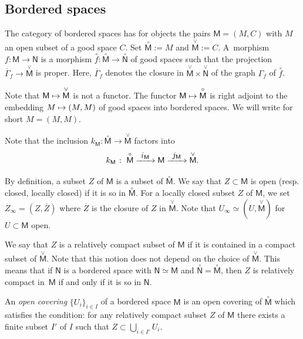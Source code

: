 \documentclass[11pt]{article}
\newcommand{\resp}{resp.\xspace}
\numberwithin{equation}{section}
\newcommand\mto{\mathchoice{\longmapsto}{\mapsto}{\mapsto}{\mapsto}}
\newcommand{\To}[1][]{\mathchoice{\xrightarrow{\textstyle\kern4pt#1\kern3pt}}{\stackrel{#1}{\longrightarrow}}{}{}}
\let\sbcup\bigcup
\newcommand{\accentset}[2]{\overset{#1}{#2}}
\theoremstyle{plain}
\theoremstyle{definition}
\newcommand{\bclose}[1]{{\accentset{\vee}{#1}}}\let\cc\bclose
\newcommand{\unbordered}[1]{{\accentset{\circ}{#1}}}
\let\oo \unbordered
\newcommand{\inbordered}[1]{{#1_\infty}}
\newcommand{\bbM}{\mathsf{M}}
\newcommand{\obM}{\unbordered{\bbM}}
\newcommand{\cbM}{\bclose{\bbM}}
\newcommand{\bbN}{\mathsf{N}}
\newcommand{\obN}{\unbordered{\bbN}}
\newcommand{\cbN}{\bclose{\bbN}}
\newcommand{\inc}[1][\bbM]{k_{#1}}
\newcommand{\bZ}{\inbordered{Z}}
\newcommand{\bU}{\inbordered{U}}
\let\ccM C
\newcommand{\defeq}{\mathbin{:=}}\let \seteq\defeq
\newcommand{\st}[1]{{\{{#1}\}}}
\begin{document}
\subsection{Bordered spaces}
The category of bordered spaces has for objects the pairs $\bbM=(M,\ccM)$ with $M$ an open subset of a good space $\ccM$. Set $\obM\defeq M$ and $\cbM\defeq\ccM$.
A~morphism $f\colon\bbM\to\bbN$ is a morphism $\oo f\colon \obM\to \obN$ of good spaces such that the projection $\overline\Gamma_f \to \cbM$ is proper. Here, $\overline\Gamma_f$ denotes the closure in $\cbM\times\cbN$ of the graph $\Gamma_f$ of $\oo f$.

Note that $\bbM\mto\cbM$ is not a functor.
The functor $\bbM\mto\obM$ is right adjoint to the embedding $M\mto(M,M)$ of good spaces into bordered spaces.
We will write for short $M=(M,M)$.

Note that the inclusion $\inc\colon\obM\to\cbM$ factors into
\begin{equation}
\label{eq:k}
\inc\;\colon\; \obM \To[i_\bbM] \bbM\To[j_\bbM] \cbM.
\end{equation}

By definition, a subset $Z$ of $\bbM$ is a subset of $\obM$.
We say that $Z\subset\bbM$ is open (\resp closed, locally closed) if it is so in $\obM$.
For a locally closed subset $Z$ of $\bbM$,
we set $\bZ=(Z,\overline Z)$ where $\overline Z$ is the closure of $Z$ in $\cbM$.
Note that $\bU\simeq(U,\cbM)$ for $U\subset\bbM$ open.

We say that $Z$ is a relatively compact subset of $\bbM$
if it is contained in a compact subset of $\cbM$.
Note that this notion does not depend on the choice of $\cbM$.
This means that if $\bbN$ is a bordered space with $\bbN\simeq\bbM$ and $\obN=\obM$, then $Z$ is relatively compact in~$\bbM$ if and only if it is so in $\bbN$.

An \emph{open covering} $\st{ U_i}_{i\in I}$ of a bordered space $\bbM$ is
an open covering of $\obM$ which satisfies the condition:
for any relatively compact subset $Z$ of $\bbM$ there exists a finite subset $I'$ of $I$ such that $Z\subset\sbcup_{i\in I'}U_i$.
\end{document}
